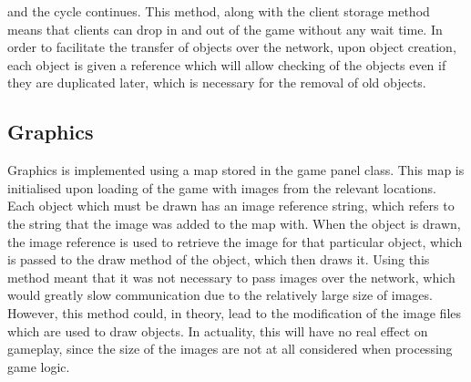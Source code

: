 and the cycle continues. This method, along with the client storage method means that clients can drop in and out of the game without any wait time. In order to facilitate the transfer of objects over the network, upon object creation, each object is given a reference which will allow checking of the objects even if they are duplicated later, which is necessary for the removal of old objects.
\subsection{Graphics}
Graphics is implemented using a map stored in the game panel class. This map is initialised upon loading of the game with images from the relevant locations. Each object which must be drawn has an image reference string, which refers to the string that the image was added to the map with. When the object is drawn, the image reference is used to retrieve the image for that particular object, which is passed to the draw method of the object, which then draws it. Using this method meant that it was not necessary to pass images over the network, which would greatly slow communication due to the relatively large size of images. However, this method could, in theory, lead to the modification of the image files which are used to draw objects. In actuality, this will have no real effect on gameplay, since the size of the images are not at all considered when processing game logic.
